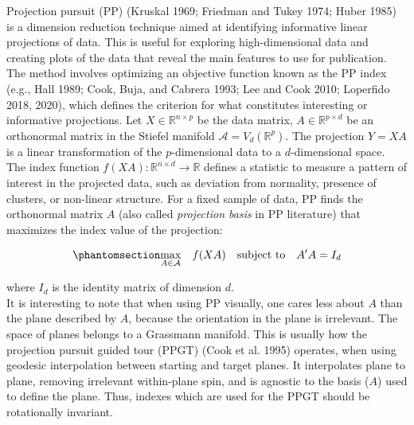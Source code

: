 \documentclass[
  12pt,
]{interact}
\theoremstyle{plain}
\begin{document}
Projection pursuit (PP) (Kruskal 1969; Friedman and Tukey 1974; Huber
1985) is a dimension reduction technique aimed at identifying
informative linear projections of data. This is useful for exploring
high-dimensional data and creating plots of the data that reveal the
main features to use for publication. The method involves optimizing an
objective function known as the PP index (e.g., Hall 1989; Cook, Buja,
and Cabrera 1993; Lee and Cook 2010; Loperfido 2018, 2020), which
defines the criterion for what constitutes interesting or informative
projections. Let \(X \in \mathbb{R}^{n\times p}\) be the data matrix,
\(A \in\mathbb{R}^{p \times d}\) be an orthonormal matrix in the Stiefel
manifold \(\mathcal{A} = V_d(\mathbb{R}^p)\). The projection \(Y = XA\)
is a linear transformation of the \(p\)-dimensional data to a
\(d\)-dimensional space. The index function
\(f(XA): \mathbb{R}^{n \times d} \to \mathbb{R}\) defines a statistic to
measure a pattern of interest in the projected data, such as deviation
from normality, presence of clusters, or non-linear structure. For a
fixed sample of data, PP finds the orthonormal matrix \(A\) (also called
\emph{projection basis} in PP literature) that maximizes the index value
of the projection:

\begin{equation}\phantomsection\label{eq-optimization}{
\underset{A \in \mathcal{A}}{\max } \quad f(XA) \quad \text{subject to} \quad A'A = I_d
}\end{equation}

where \(I_d\) is the identity matrix of dimension \(d\).\\
It is interesting to note that when using PP visually, one cares less
about \(A\) than the plane described by \(A\), because the orientation
in the plane is irrelevant. The space of planes belongs to a Grassmann
manifold. This is usually how the projection pursuit guided tour (PPGT)
(Cook et al. 1995) operates, when using geodesic interpolation between
starting and target planes. It interpolates plane to plane, removing
irrelevant within-plane spin, and is agnostic to the basis (\(A\)) used
to define the plane. Thus, indexes which are used for the PPGT should be
rotationally invariant.
\end{document}
